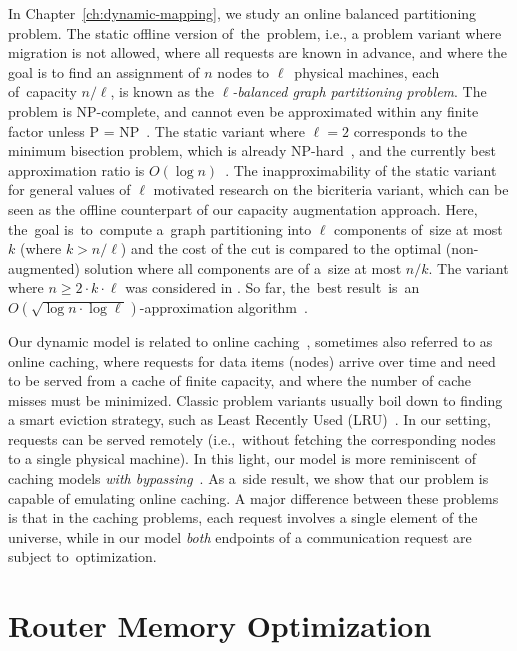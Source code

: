 In Chapter~\ref{ch:dynamic-mapping}, we study an online balanced partitioning problem.
The static offline version of~the~problem, i.e., a problem variant where
migration is not allowed, where all requests are known in advance, and where
the goal is to find an assignment of $n$ nodes to $\ell$~physical machines, each of~capacity $n/\ell$, is known as the
\emph{$\ell$-balanced graph partitioning problem}. The problem is 
NP-complete, and cannot even be approximated within any finite factor unless P
= NP~\cite{AndRae06}.  The static
variant where $\ell = 2$ corresponds to the minimum bisection problem, which
is already NP-hard~\cite{GaJoSt76}, and 
the currently best approximation ratio is $O(\log n)$~\cite{SarVaz95,ArKaKa99,FeKrNi00,FeiKra02,KraFei06,Raec08}.
The inapproximability of the static variant for general values of $\ell$
motivated research on the bicriteria variant, which can be seen as the offline
counterpart of our capacity augmentation approach. Here, the~goal
is~to~compute a~graph partitioning into $\ell$ components of~size at most~$k$ (where $k > n/\ell$) and the cost of the cut is compared to the optimal (non-augmented)
solution where all components are of a~size at most $n/k$. The variant where
$n \geq 2 \cdot k \cdot \ell$ was considered in
\cite{LeMaTr90,SimTen97,EvNaRS00,EvNaRS99,KrNaSc09}. So far, the~best result~is~an~$O(\!\sqrt{\log n \cdot \log \ell})$-approximation algorithm~\cite{KrNaSc09}.

Our dynamic model is related to online
caching~\cite{SleTar85,FKLMSY91,McGSle91,AcChNo00}, sometimes also referred to
as online caching, where requests for data items (nodes) arrive over time and
need to be served from a cache of finite capacity, and where the number of
cache misses must be minimized. Classic problem variants usually boil down to
finding a smart eviction strategy, such as Least Recently Used (LRU)~\cite{SleTar85}. In our
setting, requests can be served remotely (i.e.,~without fetching the
corresponding nodes to a single physical machine). In this light, our model is more
reminiscent of caching models \emph{with
bypassing}~\cite{EpImLN11,EpImLN15,Irani02}. As a~side result, we show that our problem is
capable of emulating online caching.
A major difference between  these problems is that in the caching problems, each request involves a single element of the universe, while in our model \emph{both} endpoints of a communication request are subject to~optimization.



\section{Router Memory Optimization}
\label{sec:intro-packet-forwarding}


